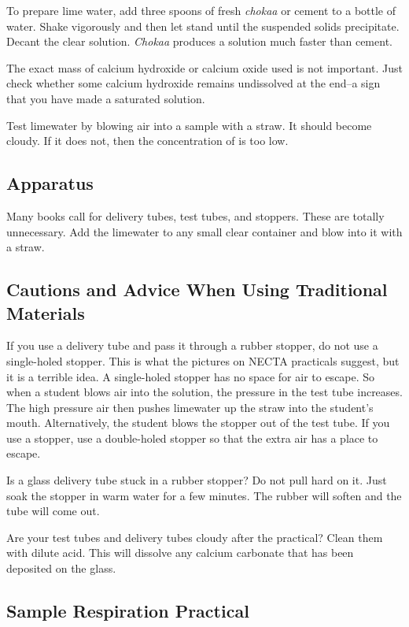To prepare lime water, add three spoons of fresh \textit{chokaa} or cement to a bottle of water. Shake vigorously and then let stand until the suspended solids precipitate. Decant the clear solution. \textit{Chokaa} produces a solution much faster than cement.

The exact mass of calcium hydroxide or calcium oxide used is not important. Just check whether some calcium hydroxide remains undissolved at the end--a sign that you have made a saturated solution.

Test limewater by blowing air into a sample with a straw. It should become cloudy. If it does not, then the concentration of  is too low.

\subsection{Apparatus}
Many books call for delivery tubes, test tubes, and stoppers. These are totally unnecessary. Add the limewater to any small clear container and blow into it with a straw.

\subsection{Cautions and Advice When Using Traditional Materials}
If you use a delivery tube and pass it through a rubber stopper, do not use a single-holed stopper. This is what the pictures on NECTA practicals suggest, but it is a terrible idea. A single-holed stopper has no space for air to escape. So when a student blows air into the solution, the pressure in the test tube increases. The high pressure air then pushes limewater up the straw into the student's mouth. Alternatively, the student blows the stopper out of the test tube. If you use a stopper, use a double-holed stopper so that the extra air has a place to escape.

Is a glass delivery tube stuck in a rubber stopper? Do not pull hard on it. Just soak the stopper in warm water for a few minutes. The rubber will soften and the tube will come out.

Are your test tubes and delivery tubes cloudy after the practical? Clean them with dilute acid. This will dissolve any calcium carbonate that has been deposited on the glass.

\subsection{Sample Respiration Practical}

